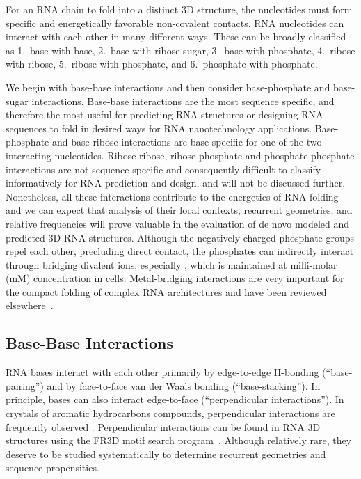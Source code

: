 For an RNA chain to fold into a distinct 3D structure, the nucleotides must form
specific and energetically favorable non-covalent contacts. RNA nucleotides can
interact with each other in many different ways. These can be broadly classified
as 1.\ base with base, 2.\ base with ribose sugar, 3.\ base with phosphate, 4.\
ribose with ribose, 5.\ ribose with phosphate, and 6.\ phosphate with phosphate. 

We begin with base-base interactions and then consider base-phosphate and
base-sugar interactions. Base-base interactions are the most sequence specific,
and therefore the most useful for predicting RNA structures or designing RNA
sequences to fold in desired ways for RNA nanotechnology applications.
Base-phosphate and base-ribose interactions are base specific for one of the two
interacting nucleotides. Ribose-ribose, ribose-phosphate and phosphate-phosphate
interactions are not sequence-specific and consequently difficult to classify
informatively for RNA prediction and design, and will not be discussed further.
Nonetheless, all these interactions contribute to the energetics of RNA folding
and we can expect that analysis of their local contexts, recurrent geometries,
and relative frequencies will prove valuable in the evaluation of de novo
modeled and predicted 3D RNA structures. Although the negatively charged
phosphate groups repel each other, precluding direct contact, the phosphates can
indirectly interact through bridging divalent ions, especially \ce{Mg2+}, which is
maintained at milli-molar (mM) concentration in cells. Metal-bridging
interactions are very important for the compact folding of complex RNA
architectures and have been reviewed elsewhere~\cite{Woodson2005, Bowman2012}. 

\subsection{Base-Base Interactions}

RNA bases interact with each other primarily by edge-to-edge H-bonding
(``base-pairing'') and by face-to-face van der Waals bonding
(``base-stacking''). In principle, bases can also interact edge-to-face
(``perpendicular interactions''). In crystals of aromatic hydrocarbons
compounds, perpendicular interactions are frequently observed
\cite{Desiraju1989}. Perpendicular interactions can be found in RNA 3D
structures using the FR3D motif search program~\cite{Petrov2011a}. Although
relatively rare, they deserve to be studied systematically to determine
recurrent geometries and sequence propensities. 

